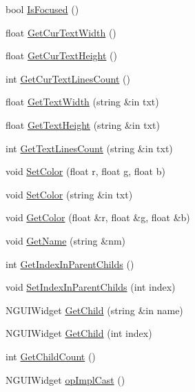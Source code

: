 \begin{DoxyCompactItemize}
bool \hyperlink{class_n_g_u_i_image_drawer_aed9172eed97574a393de7a20bf55e6b0}{Is\+Focused} ()
\item 
float \hyperlink{class_n_g_u_i_image_drawer_aefbb259b2c2ee4f495bc0af54f6ea18d}{Get\+Cur\+Text\+Width} ()
\item 
float \hyperlink{class_n_g_u_i_image_drawer_a6e985a27993e6c486bc40b3d0561b57b}{Get\+Cur\+Text\+Height} ()
\item 
int \hyperlink{class_n_g_u_i_image_drawer_aa2372f7a29659c565da6b6713bc59f79}{Get\+Cur\+Text\+Lines\+Count} ()
\item 
float \hyperlink{class_n_g_u_i_image_drawer_ac7ad44de578d1d6c1f07ce66a8039502}{Get\+Text\+Width} (string \&in txt)
\item 
float \hyperlink{class_n_g_u_i_image_drawer_a8d951ab093150a2fa82ff2968e5d5cef}{Get\+Text\+Height} (string \&in txt)
\item 
int \hyperlink{class_n_g_u_i_image_drawer_ace0f90e13039f327851cc0b201487d7d}{Get\+Text\+Lines\+Count} (string \&in txt)
\item 
void \hyperlink{class_n_g_u_i_image_drawer_a0635b29dbe5074b9da8226b60fcd04b8}{Set\+Color} (float r, float g, float b)
\item 
void \hyperlink{class_n_g_u_i_image_drawer_aea5e2dd2c4fd11496f3490b3c4e146d7}{Set\+Color} (string \&in txt)
\item 
void \hyperlink{class_n_g_u_i_image_drawer_a18a87cb25dca912a16eaf50e66436e8b}{Get\+Color} (float \&r, float \&g, float \&b)
\item 
void \hyperlink{class_n_g_u_i_image_drawer_a04c25ce95748fcb9f3c0298160fa43ef}{Get\+Name} (string \&nm)
\item 
int \hyperlink{class_n_g_u_i_image_drawer_a094666492b9da95eb64465f9e7f0975e}{Get\+Index\+In\+Parent\+Childs} ()
\item 
void \hyperlink{class_n_g_u_i_image_drawer_a2ea06d9671204fe1d5330cb947b9586b}{Set\+Index\+In\+Parent\+Childs} (int index)
\item 
N\+G\+U\+I\+Widget \hyperlink{class_n_g_u_i_image_drawer_ae386b95d4257d66a5f8e7eba512a7579}{Get\+Child} (string \&in name)
\item 
N\+G\+U\+I\+Widget \hyperlink{class_n_g_u_i_image_drawer_a84e5123524010398419749efa275585f}{Get\+Child} (int index)
\item 
int \hyperlink{class_n_g_u_i_image_drawer_a467d2535f48cebe477b3fa62b3a69f1b}{Get\+Child\+Count} ()
\item 
N\+G\+U\+I\+Widget \hyperlink{class_n_g_u_i_image_drawer_a7589869394a794dfee6f36e747bd9277}{op\+Impl\+Cast} ()

\end{DoxyCompactItemize}

